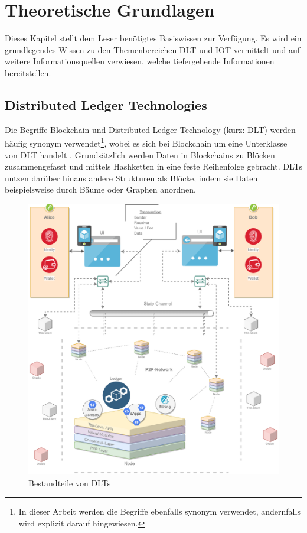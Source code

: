 \chapter{Theoretische Grundlagen}
\label{ch:fundamentals}
Dieses Kapitel stellt dem Leser benötigtes Basiswissen zur Verfügung. Es wird ein grundlegendes Wissen zu den Themenbereichen \ac{DLT} und \ac{IOT} vermittelt und auf weitere Informationsquellen verwiesen, welche tiefergehende Informationen bereitstellen.

%
%
\section{Distributed Ledger Technologies}
\label{sec:fundamentals:dlt}
Die Begriffe Blockchain und Distributed Ledger Technology (kurz: \ac{DLT}) werden häufig synonym verwendet\footnote{In dieser Arbeit werden die Begriffe ebenfalls synonym verwendet, andernfalls wird explizit darauf hingewiesen.}, wobei es sich bei Blockchain um eine Unterklasse von \ac{DLT} handelt \cite{mastering2017}. Grundsätzlich werden Daten in Blockchains zu Blöcken zusammengefasst und mittels Hashketten in eine feste Reihenfolge gebracht. \acp{DLT} nutzen darüber hinaus andere Strukturen als Blöcke, indem sie Daten beispielsweise durch Bäume oder Graphen anordnen.\\

\begin{figure}[h]
 \centering
 \includegraphics[width=1.0\textwidth]{gfx/Overview-DLT.png}
 \caption{Bestandteile von DLTs}
 \label{fig:chapter02:overview-dlt}
\end{figure}

